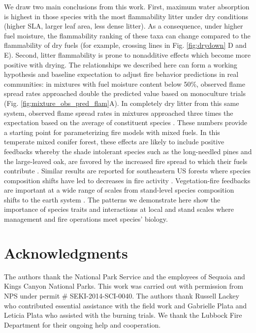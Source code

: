 \documentclass[letterpaper,12pt]{article}
\begin{document}
We draw two main conclusions from this work. First, maximum water absorption is
highest in those species with the most flammability litter under dry conditions
(higher SLA, larger leaf area, less dense litter). As a consequence, under
higher fuel moisture, the flammability ranking of these taxa can change
compared to the flammability of dry fuels (for example, crossing lines in Fig.
\ref{fig:drydown} D and E). Second, litter flammability is prone to
nonadditive effects which become more positive with drying. The relationships
we described here can form a working hypothesis and baseline expectation to
adjust fire behavior predictions in real communities: in mixtures with fuel
moisture content below 50\%, observed flame spread rates approached double the
predicted value based on monoculture trials (Fig.
\ref{fig:mixture_obs_pred_flam}A). In completely dry litter from this same
system, observed flame spread rates in mixtures approached three times the
expectation based on the average of constituent species
\citep{Magalhaes+Schwilk-2012}. These numbers provide a starting point for
parameterizing fire models with mixed fuels. In this temperate mixed conifer
forest, these effects are likely to include positive feedbacks whereby the
shade intolerant species such as the long-needled pines and the large-leaved
oak, are favored by the increased fire spread to which their fuels contribute
\citep{Schwilk+Caprio-2011}. Similar results are reported for southeastern US
forests where species composition shifts have led to decreases in fire activity
\citep{Nowacki+Abrams-2008}. Vegetation-fire feedbacks are important at a wide
range of scales from stand-level species composition shifts to the earth system
\citep{Harris+Remenyi+etal-2016, Archibald+Lehmann+etal-2018}. The patterns we
demonstrate here show the importance of species traits and interactions at
local and stand scales where management and fire operations meet species'
biology.



\section*{Acknowledgments}

The authors thank the National Park Service and the employees of Sequoia and
Kings Canyon National Parks. This work was carried out with permission from NPS
under permit \# SEKI-2014-SCI-0040. The authors thank Russell Lackey who
contributed essential assistance with the field work and Gabrielle Plata and
Leticia Plata who assisted with the burning trials. We thank the Lubbock Fire
Department for their ongoing help and cooperation.
\end{document}
